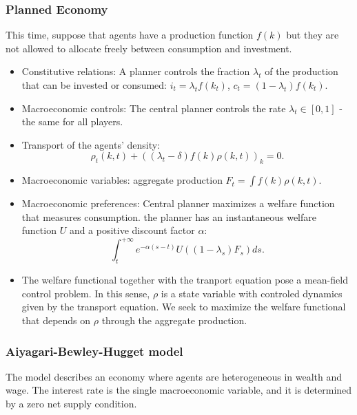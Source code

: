 \documentclass{article}
\begin{document}
\subsubsection{Planned Economy}
This time, suppose that agents have a production function $f(k)$ but they are not allowed to allocate
freely between consumption and investment.
\begin{itemize}
    \item Constitutive relations: A planner controls the fraction $\lambda_t$ of the production
    that can be invested or consumed:  $i_t = \lambda_t f(k_t)$, $c_t = (1 - \lambda_t) f(k_t)$.
    \item Macroeconomic controls: The central planner controls the rate $\lambda_t \in [0,1]$ - the same
    for all players.
    \item Transport of the agents' density: 
    $$
    \rho_t (k,t) + ( (\lambda_t - \delta) f(k) \rho(k,t) )_k = 0.
    $$
    \item Macroeconomic variables: aggregate production $F_t = \int f(k) \rho(k,t)$.
    \item Macroeconomic preferences: Central planner maximizes a welfare function that measures consumption.
    the planner has an instantaneous welfare function $U$ and a positive discount factor $\alpha$:
    $$
    \int_t^{+\infty} e^{-\alpha (s-t)} U( (1-\lambda_s)F_s )ds.
    $$
    
    \item The welfare functional together with the tranport equation pose a mean-field control problem.
    In this sense, $\rho$ is a state variable with controled dynamics given by the transport equation.
    We seek to maximize the welfare functional that depends on $\rho$ through the aggregate production.
\end{itemize}

\subsubsection{Aiyagari-Bewley-Hugget model}

The model describes an economy where agents are heterogeneous in wealth and wage. The interest rate
is the single macroeconomic variable, and it is determined by a zero net supply condition.
\end{document}
